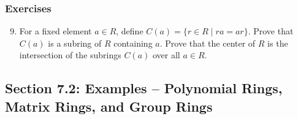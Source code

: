 \documentclass[../notes.tex]{subfiles}
\begin{document}
\subsubsection*{Exercises}
\begin{enumerate}[label={\textbf{\arabic*.}},ref={7.1.\arabic*}]
    \setcounter{enumi}{8}
    \item \label{exr:7.1.9}For a fixed element $a\in R$, define $C(a)=\{r\in R\mid ra=ar\}$. Prove that $C(a)$ is a subring of $R$ containing $a$. Prove that the center of $R$ is the intersection of the subrings $C(a)$ over all $a\in R$.
\end{enumerate}


\subsection*{Section 7.2: Examples -- Polynomial Rings, Matrix Rings, and Group Rings}
\end{document}
